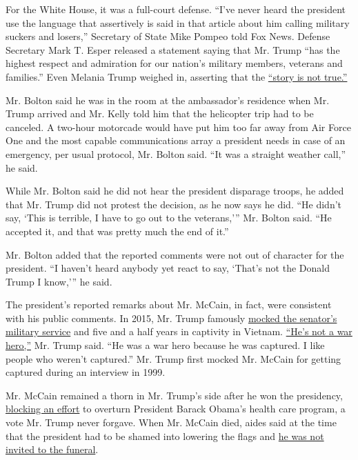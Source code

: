 For the White House, it was a full-court defense. ``I've never heard the
president use the language that assertively is said in that article
about him calling military suckers and losers,'' Secretary of State Mike
Pompeo told Fox News. Defense Secretary Mark T. Esper released a
statement saying that Mr. Trump ``has the highest respect and admiration
for our nation's military members, veterans and families.'' Even Melania
Trump weighed in, asserting that the
\href{https://twitter.com/FLOTUS/status/1302011438647701504}{``story is
not true.''}

Mr. Bolton said he was in the room at the ambassador's residence when
Mr. Trump arrived and Mr. Kelly told him that the helicopter trip had to
be canceled. A two-hour motorcade would have put him too far away from
Air Force One and the most capable communications array a president
needs in case of an emergency, per usual protocol, Mr. Bolton said. ``It
was a straight weather call,'' he said.

While Mr. Bolton said he did not hear the president disparage troops, he
added that Mr. Trump did not protest the decision, as he now says he
did. ``He didn't say, `This is terrible, I have to go out to the
veterans,''' Mr. Bolton said. ``He accepted it, and that was pretty much
the end of it.''

Mr. Bolton added that the reported comments were not out of character
for the president. ``I haven't heard anybody yet react to say, `That's
not the Donald Trump I know,''' he said.

The president's reported remarks about Mr. McCain, in fact, were
consistent with his public comments. In 2015, Mr. Trump famously
\href{https://www.nytimes3xbfgragh.onion/2015/07/19/us/politics/trump-belittles-mccains-war-record.html}{mocked
the senator's military service} and five and a half years in captivity
in Vietnam. \href{https://www.youtube.com/watch?v=7k1ajHAeXMU}{``He's
not a war hero,''} Mr. Trump said. ``He was a war hero because he was
captured. I like people who weren't captured.'' Mr. Trump first mocked
Mr. McCain for getting captured during an interview in 1999.

Mr. McCain remained a thorn in Mr. Trump's side after he won the
presidency,
\href{https://www.nytimes3xbfgragh.onion/2017/07/28/us/john-mccains-real-return.html}{blocking
an effort} to overturn President Barack Obama's health care program, a
vote Mr. Trump never forgave. When Mr. McCain died, aides said at the
time that the president had to be shamed into lowering the flags and
\href{https://www.nytimes3xbfgragh.onion/2018/09/01/us/politics/john-mccain-funeral.html}{he
was not invited to the funeral}.

